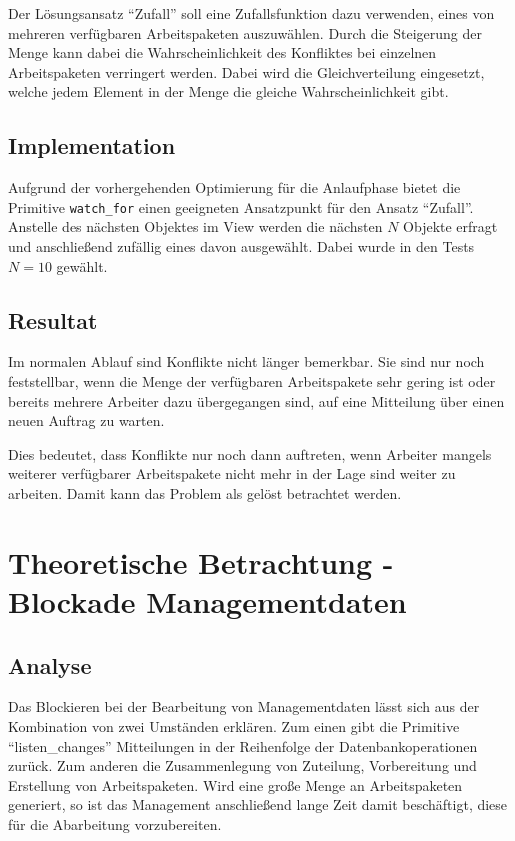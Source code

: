 Der Lösungsansatz ``Zufall'' soll eine Zufallsfunktion dazu verwenden,
eines von mehreren verfügbaren Arbeitspaketen auszuwählen.
Durch die Steigerung der Menge kann dabei die Wahrscheinlichkeit des Konfliktes bei einzelnen Arbeitspaketen verringert werden. Dabei wird die Gleichverteilung eingesetzt, welche jedem Element in der Menge die gleiche Wahrscheinlichkeit gibt.

\subsection{Implementation}

Aufgrund der vorhergehenden Optimierung für die Anlaufphase
bietet die Primitive \verb|watch_for| einen geeigneten Ansatzpunkt für den Ansatz ``Zufall''.
Anstelle des nächsten Objektes im View werden die nächsten $N$ Objekte erfragt
und anschließend zufällig eines davon ausgewählt.
Dabei wurde in den Tests $N = 10$ gewählt.

\subsection{Resultat}
Im normalen Ablauf sind Konflikte nicht länger bemerkbar.
Sie sind nur noch feststellbar, wenn die Menge der verfügbaren Arbeitspakete
sehr gering ist oder bereits mehrere Arbeiter dazu übergegangen sind,
auf eine Mitteilung über einen neuen Auftrag zu warten.

Dies bedeutet, dass Konflikte nur noch dann auftreten,
wenn Arbeiter mangels weiterer verfügbarer Arbeitspakete nicht mehr in der Lage sind weiter zu arbeiten. Damit kann das Problem als gelöst betrachtet werden.

\section{Theoretische Betrachtung - Blockade Managementdaten}
\label{cha:opt:lock-management}
\subsection{Analyse}
Das Blockieren bei der Bearbeitung von Managementdaten lässt sich
aus der Kombination von zwei Umständen erklären.
Zum einen gibt die Primitive ``listen\_changes'' Mitteilungen
in der Reihenfolge der Datenbankoperationen zurück.
Zum anderen die Zusammenlegung von Zuteilung, Vorbereitung
und Erstellung von Arbeitspaketen.
Wird eine große Menge an Arbeitspaketen generiert,
so ist das Management anschließend lange Zeit damit beschäftigt,
diese für die Abarbeitung vorzubereiten.

